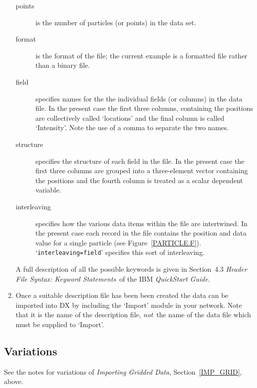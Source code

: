 \documentclass[twoside,11pt]{article}
\begin{document}
\begin{enumerate}
\begin{description}
    \item[points] is the number of particles (or points) in the data
     set.

    \item[format] is the format of the file; the current example is
     a formatted file rather than a binary file.

    \item[field] specifies names for the the individual fields (or columns) in
     the data file. In the present case the first three columns,
     containing the positions are collectively called `locations' and
     the final column is called `Intensity'. Note the use of a comma to
     separate the two names.

    \item[structure] specifies the structure of each field in the file.
     In the present case the first three columns are grouped into a
     three-element vector containing the positions and the fourth
     column is treated as a scalar dependent variable.

    \item[interleaving] specifies how the various data items within
     the file are intertwined. In the present case each record in the
     file contains the position and data value for a single particle
     (see Figure~\ref{PARTICLE.F}). `{\tt interleaving=field}'
     specifies this sort of interleaving.

  \end{description}

   A full description of all the possible keywords is given in
   Section~4.3 {\it Header File Syntax: Keyword Statements}\, of the
   IBM {\it QuickStart Guide}\cite{QUICKS}.

  \newpage
  \item Once a suitable description file has been been created the data
   can be imported into DX by including the `Import' module in your
   network. Note that it is the name of the description file, {\it not}\,
   the name of the data file which must be supplied to `Import'.

\end{enumerate}

\subsection{Variations}

See the notes for variations of {\it Importing Gridded Data},
Section~\ref{IMP_GRID}, above.
\end{document}
